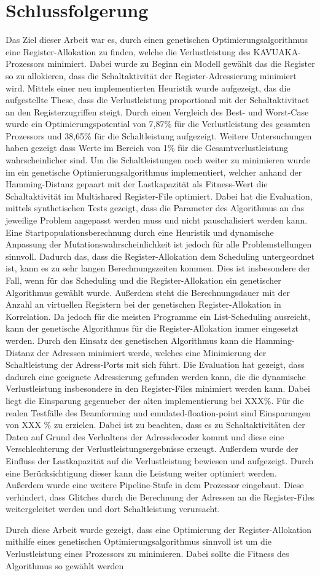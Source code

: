 \chapter{Schlussfolgerung}
\label{chap:schlussfolgerung}
Das Ziel dieser Arbeit war es, durch einen genetischen Optimierungsalgorithmus eine Register-Allokation zu finden, welche die Verlustleistung des KAVUAKA-Prozessors minimiert.  Dabei wurde zu Beginn ein Modell gewählt das die Register so zu allokieren, dass die Schaltaktivität der Register-Adressierung minimiert wird. Mittels einer neu implementierten Heuristik wurde aufgezeigt, das die aufgestellte These, dass die Verlustleistung proportional mit der Schaltaktivitaet an den Registerzugriffen steigt. Durch einen Vergleich des Best- und Worst-Case wurde ein Optimierungspotential von 7,87\% für die Verlustleistung des gesamten Prozessors und 38,65\% für die Schaltleistung aufgezeigt. Weitere Untersuchungen haben gezeigt dass Werte im Bereich von 1\% für die Gesamtverlustleistung wahrscheinlicher sind.
Um die Schaltleistungen noch weiter zu minimieren wurde im ein genetische Optimierungsalgorithmus implementiert, welcher anhand der Hamming-Distanz gepaart mit der Lastkapazität als Fitness-Wert die Schaltaktivität im Multishared Register-File optimiert. Dabei hat die Evaluation, mittels synthetischen Tests gezeigt, dass die Parameter des Algorithmus an das jeweilige Problem angepasst werden muss und nicht pauschalisiert werden kann. Eine Startpopulationsberechnung durch eine Heuristik und dynamische Anpassung der Mutationswahrscheinlichkeit ist jedoch für alle Problemstellungen sinnvoll.
Dadurch das, dass die Register-Allokation dem Scheduling untergeordnet ist, kann es zu sehr langen Berechnungszeiten kommen. Dies ist insbesondere der Fall, wenn für das Scheduling und die Register-Allokation ein genetischer Algorithmus gewählt wurde. Außerdem steht die Berechnungsdauer mit der Anzahl an virtuellen Registern bei der genetischen Register-Allokation in Korrelation. Da jedoch für die meisten Programme ein List-Scheduling ausreicht, kann der genetische Algorithmus für die Register-Allokation immer eingesetzt werden.
Durch den Einsatz des genetischen Algorithmus kann die Hamming-Distanz der Adressen minimiert werde, welches eine Minimierung der Schaltleistung der Adress-Ports mit sich führt.  
Die Evaluation hat gezeigt, dass dadurch eine geeignete Adressierung gefunden werden kann, die die dynamische Verlustleistung insbesondere in den Register-Files minimiert werden kann. Dabei liegt die Einsparung gegenueber der alten implementierung bei XXX\%. Für die realen Testfälle des Beamforming und emulated-floation-point sind Einsparungen von XXX \% zu erzielen. Dabei ist zu beachten, dass es zu Schaltaktivitäten der Daten auf Grund des Verhaltens der Adressdecoder kommt und diese eine Verschlechterung der Verlustleistungsergebnisse erzeugt.  Außerdem wurde der Einfluss der Lastkapazität auf die Verlustleistung bewiesen und aufgezeigt. Durch eine Berücksichtigung dieser kann die Leistung weiter optimiert werden.
Außerdem wurde eine weitere Pipeline-Stufe in dem Prozessor eingebaut. Diese verhindert, dass Glitches durch die Berechnung der Adressen an die Register-Files weitergeleitet werden und dort Schaltleistung verursacht.


Durch diese Arbeit wurde gezeigt, dass eine Optimierung der Register-Allokation mithilfe eines genetischen Optimierungsalgorithmus sinnvoll ist um die Verlustleistung eines Prozessors zu minimieren. Dabei sollte die Fitness des Algorithmus so gewählt werden 


